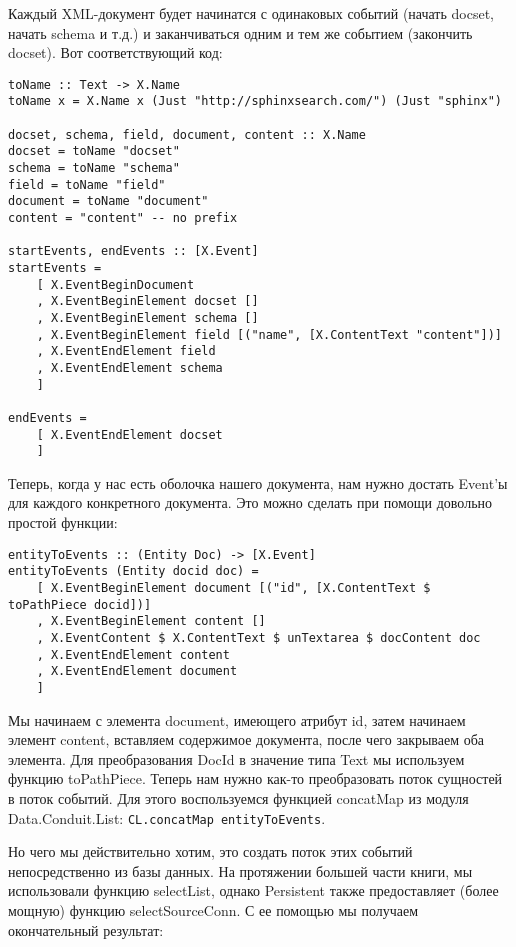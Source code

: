Каждый XML-документ будет начинатся с одинаковых событий (начать docset, начать schema и т.д.) и заканчиваться одним и тем же событием (закончить docset). Вот соответствующий код: %

\begin{lstlisting}
toName :: Text -> X.Name
toName x = X.Name x (Just "http://sphinxsearch.com/") (Just "sphinx")

docset, schema, field, document, content :: X.Name
docset = toName "docset"
schema = toName "schema"
field = toName "field"
document = toName "document"
content = "content" -- no prefix

startEvents, endEvents :: [X.Event]
startEvents =
    [ X.EventBeginDocument
    , X.EventBeginElement docset []
    , X.EventBeginElement schema []
    , X.EventBeginElement field [("name", [X.ContentText "content"])]
    , X.EventEndElement field
    , X.EventEndElement schema
    ]

endEvents =
    [ X.EventEndElement docset
    ]
\end{lstlisting}

Теперь, когда у нас есть оболочка нашего документа, нам нужно достать Event'ы для каждого конкретного документа. Это можно сделать при помощи довольно простой функции:

\begin{lstlisting}
entityToEvents :: (Entity Doc) -> [X.Event]
entityToEvents (Entity docid doc) =
    [ X.EventBeginElement document [("id", [X.ContentText $ toPathPiece docid])]
    , X.EventBeginElement content []
    , X.EventContent $ X.ContentText $ unTextarea $ docContent doc
    , X.EventEndElement content
    , X.EventEndElement document
    ]
\end{lstlisting}

Мы начинаем с элемента document, имеющего атрибут id, затем начинаем элемент content, вставляем содержимое документа, после чего закрываем оба элемента. Для преобразования DocId в значение типа Text мы используем функцию toPathPiece. Теперь нам нужно как-то преобразовать поток сущностей в поток событий. Для этого воспользуемся функцией concatMap из модуля Data.Conduit.List: \lstinline`CL.concatMap entityToEvents`.

Но чего мы действительно хотим, это создать поток этих событий непосредственно из базы данных. На протяжении большей части книги, мы использовали функцию selectList, однако Persistent также предоставляет (более мощную) функцию selectSourceConn. С ее помощью мы получаем окончательный результат: %

